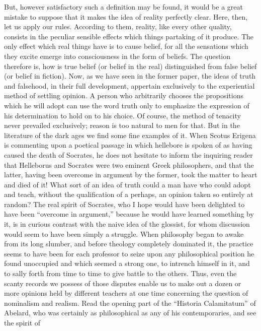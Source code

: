 But, however satisfactory such a definition may be found, it would be a great mistake to suppose that it makes the idea of reality perfectly clear. Here, then, let us apply our rules. According to them, reality, like every other quality, consists in the peculiar sensible effects which things partaking of it produce. The only effect which real things have is to cause belief, for all the sensations which they excite emerge into  consciousness in the form of beliefs. The question therefore is, how is true belief (or belief in the real) distinguished from false belief (or belief in fiction). Now, as we have seen in the former paper, the ideas of truth and falsehood, in their full development, appertain exclusively to the experiential method of settling opinion. A person who arbitrarily chooses the propositions which he will adopt can use the word truth only to emphasize the expression of his determination to hold on to his choice. Of course, the method of tenacity never prevailed exclusively; reason is too natural to men for that. But in the literature of the dark ages we find some fine examples of it. When Scotus Erigena is commenting upon a poetical passage in which hellebore is spoken of as having caused the death of Socrates, he does not
hesitate to inform the inquiring reader that Helleborus and Socrates were two eminent Greek philosophers, and that the latter, having been overcome in argument by the former, took the matter to heart and died of it! What sort of an idea of truth could a man have who could adopt and teach, without the qualification of a perhaps, an opinion taken so entirely at random? The real spirit of Socrates, who I hope would have been delighted to have been ``overcome in argument,'' because he would have learned something by it, is in curious contrast with the naive idea of the glossist, for whom discussion would seem to have been simply a struggle. When philosophy began to awake from its long slumber, and before theology completely dominated it, the practice seems to have been for each professor to seize upon any philosophical position he found unoccupied and which seemed a strong one, to intrench himself in it, and to sally forth from time to time to give battle to the others. Thus, even the scanty records we possess of those disputes enable us to make out a dozen or more opinions held by different teachers at one time concerning the question of nominalism and realism. Read the opening part of the ``Historia Calamitatum'' of Abelard, who was certainly as philosophical as any of his contemporaries, and see the spirit of
